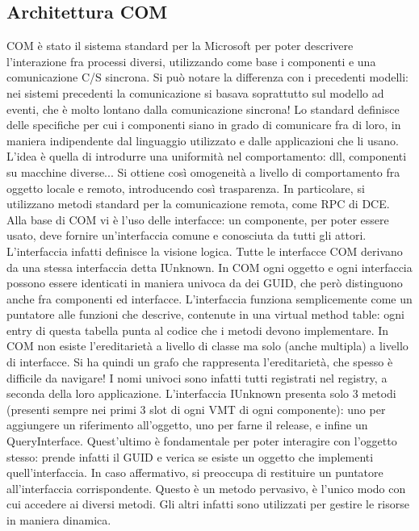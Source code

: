 \subsection{Architettura COM}
COM è stato il sistema standard per la Microsoft per poter descrivere l'interazione fra processi diversi, utilizzando 
come base i componenti e una comunicazione C/S sincrona. Si può notare la differenza con i precedenti modelli: nei
sistemi precedenti la comunicazione si basava soprattutto sul modello ad eventi, che è molto lontano dalla comunicazione 
sincrona!
Lo standard definisce delle specifiche per cui i componenti siano in grado di comunicare fra di loro, in maniera 
indipendente dal linguaggio utilizzato e dalle applicazioni che li usano. L'idea è quella di introdurre una uniformità 
nel comportamento: dll, componenti su macchine diverse... Si ottiene così omogeneità a livello di comportamento fra 
oggetto locale e remoto, introducendo così trasparenza. In particolare, si utilizzano metodi standard per la 
comunicazione remota, come RPC di DCE.
Alla base di COM vi è l'uso delle interfacce: un componente, per poter essere usato, deve fornire un'interfaccia comune 
e conosciuta da tutti gli attori. L'interfaccia infatti definisce la visione logica. Tutte le interfacce COM
derivano da una stessa interfaccia detta IUnknown. In COM ogni oggetto e ogni interfaccia possono essere identicati in 
maniera univoca da dei GUID, che però distinguono anche fra componenti ed interfacce.
L'interfaccia funziona semplicemente come un puntatore alle funzioni che descrive, contenute in una virtual method
table: ogni entry di questa tabella punta al codice che i metodi devono implementare. In COM non esiste l'ereditarietà
a livello di classe ma solo (anche multipla) a livello di interfacce. Si ha quindi un grafo che rappresenta 
l'ereditarietà, che spesso è difficile da navigare! I nomi univoci sono infatti tutti registrati nel registry, a seconda 
della loro applicazione.
L'interfaccia IUnknown presenta solo 3 metodi (presenti sempre nei primi 3 slot di ogni VMT di ogni componente): uno per 
aggiungere un riferimento all'oggetto, uno per farne il release, e infine un QueryInterface. Quest'ultimo è fondamentale 
per poter interagire con l'oggetto stesso: prende infatti il GUID e verica se esiste un oggetto che implementi 
quell'interfaccia. In caso affermativo, si preoccupa di restituire un puntatore all'interfaccia corrispondente. Questo è 
un metodo pervasivo, è l'unico modo con cui accedere ai diversi metodi. Gli altri infatti sono utilizzati per gestire le 
risorse in maniera dinamica.

